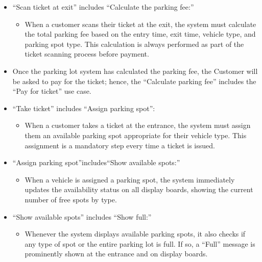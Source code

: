 \begin{itemize}
\item
\protect{}\label{FkktDYyjgy93m-bQGVzdD}
``Scan ticket at exit'' includes ``Calculate the parking fee:''

\begin{itemize}
\item
When a customer scans their ticket at the exit, the system must calculate the total parking fee based on the entry time, exit time, vehicle type, and parking spot type. This calculation is always performed as part of the ticket scanning process before payment.
\end{itemize}
\item
\protect{}\label{Qwp9k0THgsB1PhjwUKMok}
Once the parking lot system has calculated the parking fee, the Customer will be asked to pay for the ticket; hence, the ``Calculate parking fee'' includes the ``Pay for ticket'' use case.
\item
\protect{}\label{UdwHiKkCBPbp4gLw68Ail}
``Take ticket'' includes ``Assign parking spot'':

\begin{itemize}
\item
When a customer takes a ticket at the entrance, the system must assign them an available parking spot appropriate for their vehicle type. This assignment is a mandatory step every time a ticket is issued.
\end{itemize}
\item
\protect{}\label{UdwHiKkCBPbp4gLw68Ail}
``Assign parking spot''includes``Show available spots:''

\begin{itemize}
\item
When a vehicle is assigned a parking spot, the system immediately updates the availability status on all display boards, showing the current number of free spots by type.
\end{itemize}
\item
\protect{}\label{Tlrzi5RDJ4_bV-VKqaq2A}
``Show available spots'' includes ``Show full:''

\begin{itemize}
\item
Whenever the system displays available parking spots, it also checks if any type of spot or the entire parking lot is full. If so, a ``Full'' message is prominently shown at the entrance and on display boards.
\end{itemize}
\end{itemize}

